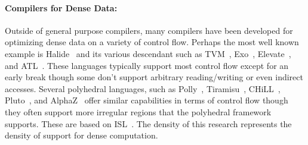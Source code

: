 \paragraph{Compilers for Dense Data:}
Outside of general purpose compilers, many compilers have been developed for optimizing dense data on a variety of control flow.
%
Perhaps the most well known example is Halide~\cite{ragan-kelley_halide_2013} and its various descendant such as TVM~\cite{chen_tvm_2018}, Exo~\cite{ikarashi_exocompilation_2022}, Elevate~\cite{hagedorn_achieving_2020}, and ATL~\cite{liu_verified_2022}.
%
These languages typically support most control flow except for an early break though some don't support arbitrary reading/writing or even indirect accesses.
%
Several polyhedral languages, such as Polly~\cite{grosser_pollyperforming_2012}, Tiramisu~\cite{baghdadi_tiramisu_2019}, CHiLL~\cite{chen_framework_2008}, Pluto~\cite{bondhugula_pluto_2008}, and AlphaZ~\cite{yuki_alphaz_2012} offer similar capabilities in terms of control flow though they often support more irregular regions that the polyhedral framework supports.
%
These are based on ISL~\cite{verdoolaege_isl_2010}.
%
The density of this research represents the density of support for dense computation.


